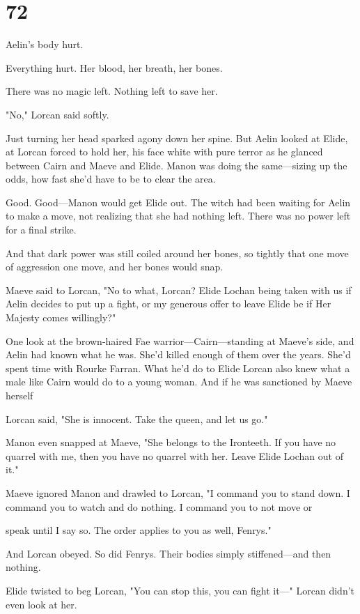 
\chapter{72}

Aelin's body hurt.

Everything hurt. Her blood, her breath, her bones.

There was no magic left. Nothing left to save her.

"No," Lorcan said softly.

Just turning her head sparked agony down her spine. But Aelin looked at Elide, at Lorcan forced to hold her, his face white with pure terror as he glanced between Cairn and Maeve and Elide. Manon was doing the same---sizing up the odds, how fast she'd have to be to clear the area.

Good. Good---Manon would get Elide out. The witch had been waiting for Aelin to make a move, not realizing that  she had nothing left. There was no power left for a final strike.

And that dark power was still coiled around her bones, so tightly that one move of aggression  one move, and her bones would snap.

Maeve said to Lorcan, "No to what, Lorcan? Elide Lochan being taken with us if Aelin decides to put up a fight, or my generous offer to leave Elide be if Her Majesty comes willingly?"

One look at the brown-haired Fae warrior---Cairn---standing at Maeve's side, and Aelin had known what he was. She'd killed enough of them over the years. She'd spent time with Rourke Farran. What he'd do to Elide
 Lorcan also knew what a male like Cairn would do to a young woman. And if he was sanctioned by Maeve herself 

Lorcan said, "She is innocent. Take the queen, and let us go."

Manon even snapped at Maeve, "She belongs to the Ironteeth. If you have no quarrel with me, then you have no quarrel with her. Leave Elide Lochan out of it."

Maeve ignored Manon and drawled to Lorcan, "I command you to stand down. I command you to watch and do nothing. I command you to not move or

speak until I say so. The order applies to you as well, Fenrys."

And Lorcan obeyed. So did Fenrys. Their bodies simply stiffened---and then nothing.

Elide twisted to beg Lorcan, "You can stop this, you can fight it---" Lorcan didn't even look at her.

